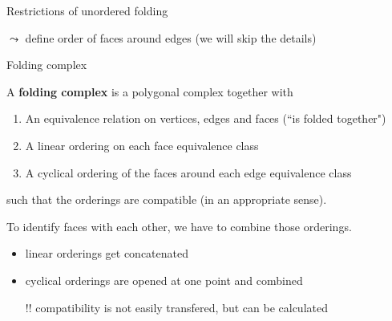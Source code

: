 \begin{frame}{Restrictions of unordered folding}
\begin{center}
    \end{center}

    \pause
    $\leadsto$ define order of faces around edges
    \pause
    (we will skip the details)
\end{frame}


\begin{frame}{Folding complex}
    \pause
    \begin{defi}
        A \textbf{folding complex}
        \pause
        is a polygonal complex together with
        \begin{enumerate}
            \pause
            \item An equivalence relation on vertices, edges and faces
                \pause (``is folded together")
            \pause
            \item A linear ordering on each face equivalence class
            \pause
            \item A cyclical ordering of the faces around each edge equivalence class
        \end{enumerate}
        \pause
        such that the orderings are compatible
        \pause
        (in an appropriate sense).
    \end{defi}

    \pause
    To identify faces with each other, we have to combine those orderings.
    \begin{itemize}
        \pause
        \item linear orderings get concatenated
        \pause
        \item cyclical orderings are opened at one point
            \pause
            and combined
        \pause
        \item[!!] compatibility is not easily transfered,
            \pause
            but can be calculated
    \end{itemize}

\end{frame}





